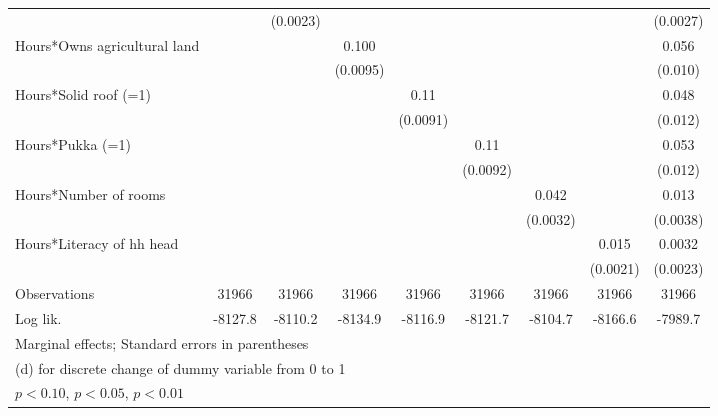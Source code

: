 \begin{table}[htbp]
\begin{tabular*}{1\hsize}{@{\hskip\tabcolsep\extracolsep\fill}l*{8}{c}}
                &                  & (0.0023)         &                  &                  &                  &                  &                  & (0.0027)         \\
Hours*Owns agricultural land&                  &                  &    0.100\sym{***}&                  &                  &                  &                  &    0.056\sym{***}\\
                &                  &                  & (0.0095)         &                  &                  &                  &                  &  (0.010)         \\
Hours*Solid roof (=1)&                  &                  &                  &     0.11\sym{***}&                  &                  &                  &    0.048\sym{***}\\
                &                  &                  &                  & (0.0091)         &                  &                  &                  &  (0.012)         \\
Hours*Pukka (=1)&                  &                  &                  &                  &     0.11\sym{***}&                  &                  &    0.053\sym{***}\\
                &                  &                  &                  &                  & (0.0092)         &                  &                  &  (0.012)         \\
Hours*Number of rooms&                  &                  &                  &                  &                  &    0.042\sym{***}&                  &    0.013\sym{***}\\
                &                  &                  &                  &                  &                  & (0.0032)         &                  & (0.0038)         \\
Hours*Literacy of hh head&                  &                  &                  &                  &                  &                  &    0.015\sym{***}&   0.0032         \\
                &                  &                  &                  &                  &                  &                  & (0.0021)         & (0.0023)         \\
\midrule
Observations    &    31966         &    31966         &    31966         &    31966         &    31966         &    31966         &    31966         &    31966         \\
Log lik.        &  -8127.8         &  -8110.2         &  -8134.9         &  -8116.9         &  -8121.7         &  -8104.7         &  -8166.6         &  -7989.7         \\
\bottomrule
\multicolumn{9}{l}{\footnotesize Marginal effects; Standard errors in parentheses}\\
\multicolumn{9}{l}{\footnotesize  (d) for discrete change of dummy variable from 0 to 1}\\
\multicolumn{9}{l}{\footnotesize \sym{*} \(p<0.10\), \sym{**} \(p<0.05\), \sym{***} \(p<0.01\)}\\
\end{tabular*}
\end{table}
